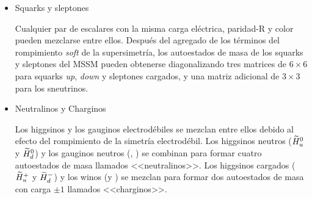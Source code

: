 \begin{itemize}\itemsep0.2cm\parskip0.2cm

\item Squarks y sleptones

  Cualquier par de escalares con la misma carga eléctrica, paridad-R y color
  pueden mezclarse entre ellos. Después del agregado de los términos del
  rompimiento \emph{soft} de la supersimetría, los autoestados de masa de los squarks y
  sleptones del MSSM pueden obtenerse diagonalizando tres matrices de $6\times6$
  para squarks \emph{up}, \emph{down} y sleptones cargados, y una matriz adicional de $3\times 3$
  para los sneutrinos.





\item Neutralinos y Charginos

Los higgsinos y los gauginos electrodébiles se mezclan entre ellos debido al
efecto del rompimiento de la simetría electrodébil. Los higgsinos neutros
($\widetilde{H}_u^0$ y $\widetilde{H}_d^0$) y los gauginos neutros (\bino, \winozero) se
combinan para formar cuatro autoestados de masa llamados <<neutralinos>>.
Los higgsinos cargados ($\widetilde{H}_u^+$ y $\widetilde{H}_d^-$) y los winos (\winop y
\winom) se mezclan para formar dos autoestados de masa con carga $\pm 1$
llamados <<charginos>>.


\end{itemize}
